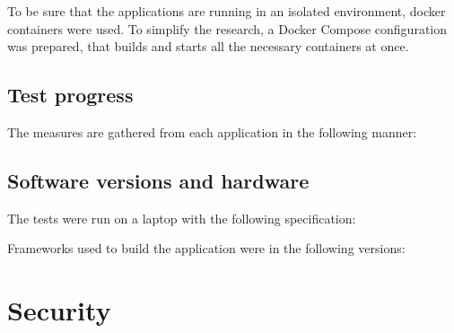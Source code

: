 To be sure that the applications are running in an isolated environment, docker containers were used. To simplify the research, a Docker Compose configuration was prepared, that builds and starts all the necessary containers at once.


\subsection{Test progress}

The measures are gathered from each application in the following manner:



\subsection{Software versions and hardware}

The tests were run on a laptop with the following specification:



Frameworks used to build the application were in the following versions:



\section{Security}
